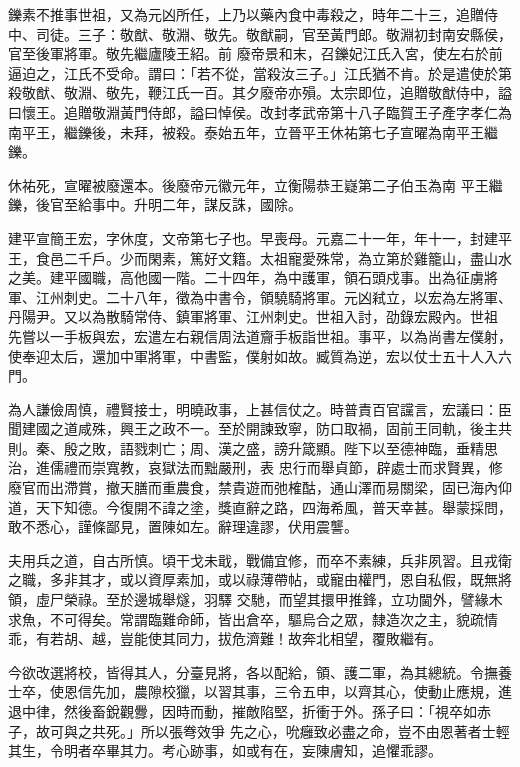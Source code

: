 \begin{pinyinscope}
 鑠素不推事世祖，又為元凶所任，上乃以藥內食中毒殺之，時年二十三，追贈侍中、司徒。三子：敬猷、敬淵、敬先。敬猷嗣，官至黃門郎。敬淵初封南安縣侯，官至後軍將軍。敬先繼廬陵王紹。前
 廢帝景和末，召鑠妃江氏入宮，使左右於前逼迫之，江氏不受命。謂曰：「若不從，當殺汝三子。」江氏猶不肯。於是遣使於第殺敬猷、敬淵、敬先，鞭江氏一百。其夕廢帝亦殞。太宗即位，追贈敬猷侍中，謚曰懷王。追贈敬淵黃門侍郎，謚曰悼侯。改封孝武帝第十八子臨賀王子產字孝仁為南平王，繼鑠後，未拜，被殺。泰始五年，立晉平王休祐第七子宣曜為南平王繼鑠。



 休祐死，宣曜被廢還本。後廢帝元徽元年，立衡陽恭王嶷第二子伯玉為南
 平王繼鑠，後官至給事中。升明二年，謀反誅，國除。



 建平宣簡王宏，字休度，文帝第七子也。早喪母。元嘉二十一年，年十一，封建平王，食邑二千戶。少而閑素，篤好文籍。太祖寵愛殊常，為立第於雞籠山，盡山水之美。建平國職，高他國一階。二十四年，為中護軍，領石頭戍事。出為征虜將軍、江州刺史。二十八年，徵為中書令，領驍騎將軍。元凶弒立，以宏為左將軍、丹陽尹。又以為散騎常侍、鎮軍將軍、江州刺史。世祖入討，劭錄宏殿內。世祖
 先嘗以一手板與宏，宏遣左右親信周法道齎手板詣世祖。事平，以為尚書左僕射，使奉迎太后，還加中軍將軍，中書監，僕射如故。臧質為逆，宏以仗士五十人入六門。



 為人謙儉周慎，禮賢接士，明曉政事，上甚信仗之。時普責百官讜言，宏議曰：臣聞建國之道咸殊，興王之政不一。至於開諫致寧，防口取禍，固前王同軌，後主共則。秦、殷之敗，語戮刺亡；周、漢之盛，謗升箴顯。陛下以至德神臨，垂精思治，進儒禮而崇寬教，哀獄法而黜嚴刑，表
 忠行而舉貞節，辟處士而求賢異，修廢官而出滯賞，撤天膳而重農食，禁貴遊而弛榷酤，通山澤而易關梁，固已海內仰道，天下知德。今復開不諱之塗，獎直辭之路，四海希風，普天幸甚。舉蒙採問，敢不悉心，謹條鄙見，置陳如左。辭理違謬，伏用震讋。



 夫用兵之道，自古所慎。頃干戈未戢，戰備宜修，而卒不素練，兵非夙習。且戎衛之職，多非其才，或以資厚素加，或以祿薄帶帖，或寵由權門，恩自私假，既無將領，虛尸榮祿。至於邊城舉燧，羽驛
 交馳，而望其擐甲推鋒，立功閫外，譬緣木求魚，不可得矣。常謂臨難命師，皆出倉卒，驅烏合之眾，隸造次之主，貌疏情乖，有若胡、越，豈能使其同力，拔危濟難！故奔北相望，覆敗繼有。



 今欲改選將校，皆得其人，分臺見將，各以配給，領、護二軍，為其總統。令撫養士卒，使恩信先加，農隙校獵，以習其事，三令五申，以齊其心，使動止應規，進退中律，然後畜銳觀釁，因時而動，摧敵陷堅，折衝于外。孫子曰：「視卒如赤子，故可與之共死。」所以張弮效爭
 先之心，吮癰致必盡之命，豈不由恩著者士輕其生，令明者卒畢其力。考心跡事，如或有在，妄陳膚知，追懼乖謬。




\end{pinyinscope}
